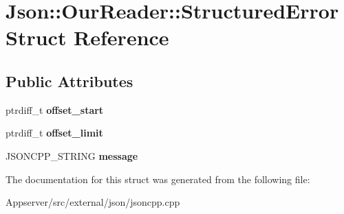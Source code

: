 \hypertarget{structJson_1_1OurReader_1_1StructuredError}{}\section{Json\+:\+:Our\+Reader\+:\+:Structured\+Error Struct Reference}
\label{structJson_1_1OurReader_1_1StructuredError}
\subsection*{Public Attributes}
\begin{DoxyCompactItemize}
\item 
ptrdiff\+\_\+t {\bfseries offset\+\_\+start}\hypertarget{structJson_1_1OurReader_1_1StructuredError_a102677698afb8177c985e72dafe72b15}{}\label{structJson_1_1OurReader_1_1StructuredError_a102677698afb8177c985e72dafe72b15}

\item 
ptrdiff\+\_\+t {\bfseries offset\+\_\+limit}\hypertarget{structJson_1_1OurReader_1_1StructuredError_a15491a751a39c5153af04e68b1d0abb9}{}\label{structJson_1_1OurReader_1_1StructuredError_a15491a751a39c5153af04e68b1d0abb9}

\item 
J\+S\+O\+N\+C\+P\+P\+\_\+\+S\+T\+R\+I\+NG {\bfseries message}\hypertarget{structJson_1_1OurReader_1_1StructuredError_a9d0b9986bf765d067dfcf2f971a450d1}{}\label{structJson_1_1OurReader_1_1StructuredError_a9d0b9986bf765d067dfcf2f971a450d1}

\end{DoxyCompactItemize}


The documentation for this struct was generated from the following file\+:\begin{DoxyCompactItemize}
\item 
Appserver/src/external/json/jsoncpp.\+cpp\end{DoxyCompactItemize}
